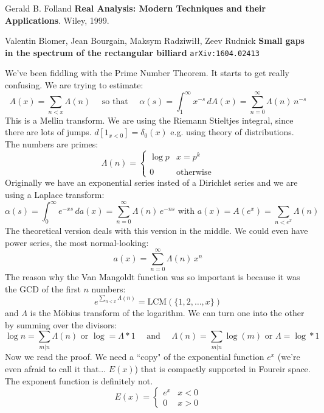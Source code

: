 \documentclass[12pt]{article}
\begin{document}
\vfill

\begin{thebibliography}{}

\item Gerald B. Folland \textbf{Real Analysis: Modern Techniques and their Applications}.  Wiley, 1999.

\item Valentin Blomer, Jean Bourgain, Maksym Radziwi\l\l, Zeev Rudnick \textbf{Small gaps in the spectrum of the rectangular billiard} \texttt{arXiv:1604.02413}

\end{thebibliography}

\newpage

\noindent We've been fiddling with the Prime Number Theorem.  It starts to get really confusing.  We are trying to estimate:
$$ A(x) =  \sum_{n < x} \Lambda(n) \quad\text{ so that }\quad \alpha(s) = \int_1^\infty x^{-s} \, d A(x) = \sum_{n=0}^\infty \Lambda(n) \, n^{-s} $$
This is a Mellin transform.  We are using the Riemann Stieltjes integral, since there are lots of jumps.  $d[1_{x < 0}] = \delta_0(x)$ e.g. using theory of distributions.  The numbers are primes:
$$ \Lambda(n) = \left\{ \begin{array}{rl} \log p & x = p^k \\ \\ 0 &  \text{otherwise} \end{array} \right. $$
Originally we have an exponential series insted of a Dirichlet series and we are using a Laplace transform:
\[ \alpha(s) = \int_0^\infty e^{-xs} \, da(x) = \sum_{n=0}^\infty \Lambda(n) \, e^{-ns} \text{ with }a(x) = A(e^x) = \sum_{n < e^x} \Lambda(n) \tag{$\ast$} \]
The theoretical version deals with this version in the middle.  We could even have power series, the most normal-looking:
$$ a(x) = \sum_{n=0}^\infty \Lambda(n) \, x^n $$
The reason why the Van Mangoldt function was so important is because it was the GCD of the first $n$ numbers:
$$ e^{\sum_{n < x} \Lambda(n) } = \text{LCM}(\{1,2,\dots, x\})$$
and $\Lambda$ is the M\"{o}bius transform of the logarithm.  We can turn one into the other by summing over the divisors:
$$ \log n = \sum_{m|n} \Lambda(n) \text{ or }\log = \Lambda * 1 \quad\text{ and }\quad \Lambda(n) = \sum_{m|n} \log(m) \text{ or } \Lambda = \log * 1 $$
Now we read the proof.  We need a ``copy" of the exponential function $e^x$ (we're even afraid to call it that... $E(x)$) that is compactly supported in Foureir space.  The exponent function is definitely not.
$$ E(x) = \left\{ \begin{array}{cc} e^x & x < 0 \\ 0 & x > 0 \end{array} \right. $$
\end{document}
